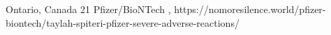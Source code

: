           {
            Ontario, Canada
          }
          {
            21
          }
          {
            Pfizer/BioNTech
          }
          {
          }
          {
            ,
          }
          {
            https://nomoresilence.world/pfizer-biontech/taylah-spiteri-pfizer-severe-adverse-reactions/
          }

